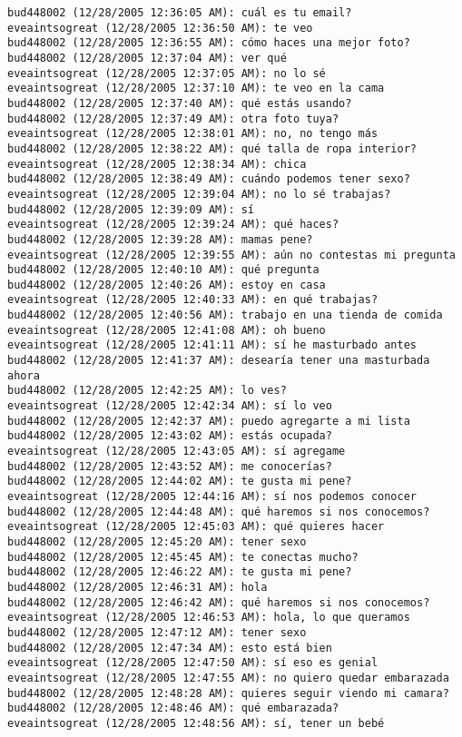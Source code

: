 \begin{verbatim}
bud448002 (12/28/2005 12:36:05 AM): cuál es tu email?
eveaintsogreat (12/28/2005 12:36:50 AM): te veo
bud448002 (12/28/2005 12:36:55 AM): cómo haces una mejor foto?
bud448002 (12/28/2005 12:37:04 AM): ver qué
eveaintsogreat (12/28/2005 12:37:05 AM): no lo sé 
eveaintsogreat (12/28/2005 12:37:10 AM): te veo en la cama
bud448002 (12/28/2005 12:37:40 AM): qué estás usando?
bud448002 (12/28/2005 12:37:49 AM): otra foto tuya?
eveaintsogreat (12/28/2005 12:38:01 AM): no, no tengo más
bud448002 (12/28/2005 12:38:22 AM): qué talla de ropa interior?
eveaintsogreat (12/28/2005 12:38:34 AM): chica
bud448002 (12/28/2005 12:38:49 AM): cuándo podemos tener sexo?
eveaintsogreat (12/28/2005 12:39:04 AM): no lo sé trabajas?
bud448002 (12/28/2005 12:39:09 AM): sí
eveaintsogreat (12/28/2005 12:39:24 AM): qué haces?
bud448002 (12/28/2005 12:39:28 AM): mamas pene?
eveaintsogreat (12/28/2005 12:39:55 AM): aún no contestas mi pregunta
bud448002 (12/28/2005 12:40:10 AM): qué pregunta
bud448002 (12/28/2005 12:40:26 AM): estoy en casa
eveaintsogreat (12/28/2005 12:40:33 AM): en qué trabajas?
bud448002 (12/28/2005 12:40:56 AM): trabajo en una tienda de comida
eveaintsogreat (12/28/2005 12:41:08 AM): oh bueno
eveaintsogreat (12/28/2005 12:41:11 AM): sí he masturbado antes
bud448002 (12/28/2005 12:41:37 AM): desearía tener una masturbada ahora
bud448002 (12/28/2005 12:42:25 AM): lo ves?
eveaintsogreat (12/28/2005 12:42:34 AM): sí lo veo
bud448002 (12/28/2005 12:42:37 AM): puedo agregarte a mi lista
bud448002 (12/28/2005 12:43:02 AM): estás ocupada?
eveaintsogreat (12/28/2005 12:43:05 AM): sí agregame
bud448002 (12/28/2005 12:43:52 AM): me conocerías?
bud448002 (12/28/2005 12:44:02 AM): te gusta mi pene?
eveaintsogreat (12/28/2005 12:44:16 AM): sí nos podemos conocer
bud448002 (12/28/2005 12:44:48 AM): qué haremos si nos conocemos?
eveaintsogreat (12/28/2005 12:45:03 AM): qué quieres hacer
bud448002 (12/28/2005 12:45:20 AM): tener sexo
bud448002 (12/28/2005 12:45:45 AM): te conectas mucho?
bud448002 (12/28/2005 12:46:22 AM): te gusta mi pene?
bud448002 (12/28/2005 12:46:31 AM): hola
bud448002 (12/28/2005 12:46:42 AM): qué haremos si nos conocemos?
eveaintsogreat (12/28/2005 12:46:53 AM): hola, lo que queramos
bud448002 (12/28/2005 12:47:12 AM): tener sexo
bud448002 (12/28/2005 12:47:34 AM): esto está bien
eveaintsogreat (12/28/2005 12:47:50 AM): sí eso es genial
eveaintsogreat (12/28/2005 12:47:55 AM): no quiero quedar embarazada
bud448002 (12/28/2005 12:48:28 AM): quieres seguir viendo mi camara?
bud448002 (12/28/2005 12:48:46 AM): qué embarazada?
eveaintsogreat (12/28/2005 12:48:56 AM): sí, tener un bebé

\end{verbatim}
